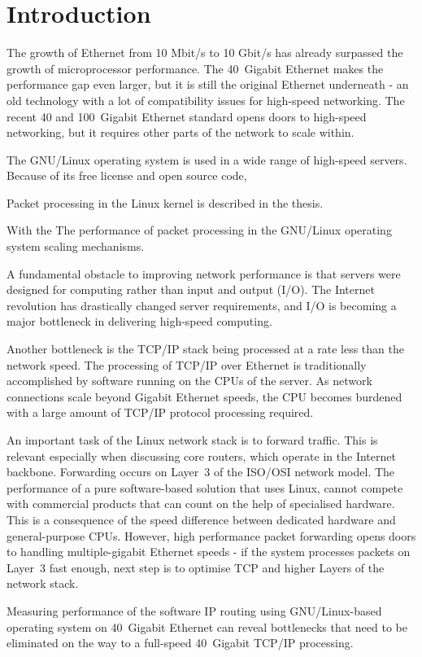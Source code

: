 
\chapter{Introduction}
The growth of Ethernet from 10 Mbit/s to 10 Gbit/s has already surpassed
the growth of microprocessor performance.
The 40~Gigabit Ethernet makes the performance gap even larger, but
it is still the original Ethernet underneath - an old technology
with a lot of compatibility issues for high-speed networking.
The recent 40 and 100~Gigabit Ethernet standard opens doors to
high-speed networking, but it requires other parts of the network to scale within.

The GNU/Linux operating system is used in a wide range of high-speed servers.
Because of its free license and open source code,

Packet processing in the Linux kernel is described in the thesis.

With the 
The performance of packet processing in the GNU/Linux operating
system 
scaling mechanisms.


A fundamental obstacle to improving network performance is that servers were designed
for computing rather than input and output (I/O).
The Internet revolution has drastically changed server requirements,
and I/O is becoming a major bottleneck in delivering high-speed computing.





Another bottleneck is the TCP/IP stack being processed at a rate less than the network speed.
The processing of TCP/IP over Ethernet is traditionally accomplished by software running on the CPUs of the server.
As network connections scale beyond Gigabit Ethernet speeds,
the CPU becomes burdened with a large amount of TCP/IP protocol processing required.


An important task of the Linux network stack is to forward traffic.
This is relevant especially when discussing core routers, which operate in the Internet backbone.
Forwarding occurs on Layer~3 of the ISO/OSI network model.
The performance of a pure software-based solution that uses Linux, cannot compete
with commercial products that can count on the help of specialised hardware.
This is a consequence of the speed difference between dedicated hardware and general-purpose CPUs.
However, high performance packet forwarding opens doors to handling multiple-gigabit Ethernet speeds -
if the system processes packets on Layer~3 fast enough,
next step is to optimise TCP and higher Layers of the network stack.

Measuring performance of the software IP routing using GNU/Linux-based operating system on 40~Gigabit Ethernet
can reveal bottlenecks that need to be eliminated
on the way to a full-speed 40~Gigabit TCP/IP processing.
